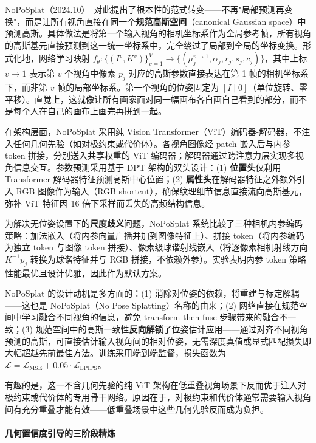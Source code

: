 NoPoSplat（2024.10）~\cite{2410_24207}对此提出了根本性的范式转变——不再"局部预测再变换"，而是让所有视角直接在同一个\textbf{规范高斯空间}（canonical Gaussian space）中预测高斯。具体做法是将第一个输入视角的相机坐标系作为全局参考帧，所有视角的高斯基元直接预测到这一统一坐标系中，完全绕过了局部到全局的坐标变换。形式化地，网络学习映射 $f_\theta: \{(I^v, K^v)\}_{v=1}^V \rightarrow \{(\mu_j^{v \rightarrow 1}, \alpha_j, r_j, s_j, c_j)\}$，其中上标 $v \rightarrow 1$ 表示第 $v$ 个视角中像素 $p_j$ 对应的高斯参数直接表达在第 1 帧的相机坐标系下，而非第 $v$ 帧的局部坐标系。第一个视角的位姿固定为 $[I \mid 0]$（单位旋转、零平移）。直觉上，这就像让所有画家面对同一幅画布各自画自己看到的部分，而不是每个人在自己的画布上画完再拼到一起。

在架构层面，NoPoSplat 采用纯 Vision Transformer（ViT）编码器-解码器，不注入任何几何先验（如对极约束或代价体）。各视角图像经 patch 嵌入后与内参 token 拼接，分别送入共享权重的 ViT 编码器；解码器通过跨注意力层实现多视角信息交互。参数预测采用基于 DPT 架构的双头设计：(1) \textbf{位置头}仅利用 Transformer 解码器特征预测高斯中心位置；(2) \textbf{属性头}在解码器特征之外额外引入 RGB 图像作为输入（RGB shortcut），确保纹理细节信息直接流向高斯基元，弥补 ViT 特征因 16 倍下采样而丢失的高频结构信息。

为解决无位姿设置下的\textbf{尺度歧义}问题，NoPoSplat 系统比较了三种相机内参编码策略：加法嵌入（将内参向量广播并加到图像特征上）、拼接 token（将内参编码为独立 token 与图像 token 拼接）、像素级球谐射线嵌入（将逐像素相机射线方向 $K^{-1}p_j$ 转换为球谐特征并与 RGB 拼接，不依赖外参）。实验表明内参 token 策略性能最优且设计优雅，因此作为默认方案。

NoPoSplat 的设计动机是多方面的：(1) 消除对位姿的依赖，将重建与标定解耦——这也是 NoPoSplat（No Pose Splatting）名称的由来；(2) 网络直接在规范空间中学习融合不同视角的信息，避免 transform-then-fuse 步骤带来的融合不一致；(3) 规范空间中的高斯一致性\textbf{反向解锁}了位姿估计应用——通过对齐不同视角预测的高斯，可直接估计输入视角间的相对位姿，无需深度真值或显式匹配损失即大幅超越先前最佳方法。训练采用端到端监督，损失函数为 $\mathcal{L} = \mathcal{L}_\text{MSE} + 0.05 \cdot \mathcal{L}_\text{LPIPS}$。

有趣的是，这一不含几何先验的纯 ViT 架构在低重叠视角场景下反而优于注入对极约束或代价体的专用骨干网络。原因在于，对极约束和代价体通常需要输入视角间有充分重叠才能有效——低重叠场景中这些几何先验反而成为负担。

\paragraph{几何置信度引导的三阶段精炼}

